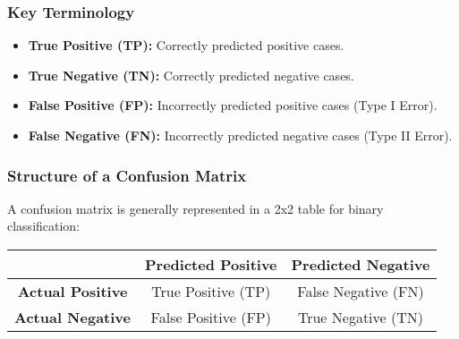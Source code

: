 \documentclass[aspectratio=169]{beamer}
\begin{document}
\begin{frame}[fragile]
  \frametitle{Key Terminology}
  \begin{itemize}
    \item \textbf{True Positive (TP):} Correctly predicted positive cases.
    \item \textbf{True Negative (TN):} Correctly predicted negative cases.
    \item \textbf{False Positive (FP):} Incorrectly predicted positive cases (Type I Error).
    \item \textbf{False Negative (FN):} Incorrectly predicted negative cases (Type II Error).
  \end{itemize}
\end{frame}

\begin{frame}[fragile]
  \frametitle{Structure of a Confusion Matrix}
  A confusion matrix is generally represented in a 2x2 table for binary classification:
  \begin{center}
    \begin{tabular}{|c|c|c|}
      \hline
             & \textbf{Predicted Positive} & \textbf{Predicted Negative} \\
      \hline
      \textbf{Actual Positive} & True Positive (TP) & False Negative (FN) \\
      \hline
      \textbf{Actual Negative} & False Positive (FP) & True Negative (TN) \\
      \hline
    \end{tabular}
  \end{center}
\end{frame}
\end{document}
